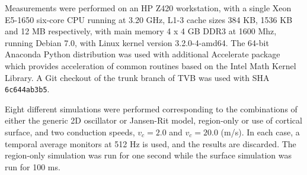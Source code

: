 	Measurements were
	performed on an HP Z420 workstation, with a single Xeon E5-1650
	six-core CPU running at 3.20 GHz, L1-3 cache sizes 384 KB, 1536 KB
	and 12 MB respectively, with main memory 4 x 4 GB DDR3 at 1600 Mhz,
	running Debian 7.0, with Linux kernel version 3.2.0-4-amd64. 
	The 64-bit Anaconda Python distribution was used with additional Accelerate
	package which provides acceleration of common routines based on the 
	Intel Math Kernel Library. A Git checkout of the trunk branch of TVB 
	was used with SHA \texttt{6c644ab3b5}.

	Eight different simulations were performed corresponding to the combinations of
	either the generic 2D oscillator or Jansen-Rit model, region-only
	or use of cortical surface, and two conduction speeds, $v_c = 2.0$ and
	$v_c = 20.0$ (m/s). In each case, a temporal average monitors at 512 Hz
	is used, and the results are discarded. The region-only simulation was
	run for one second while the surface simulation was run for 100 ms. 



%	
